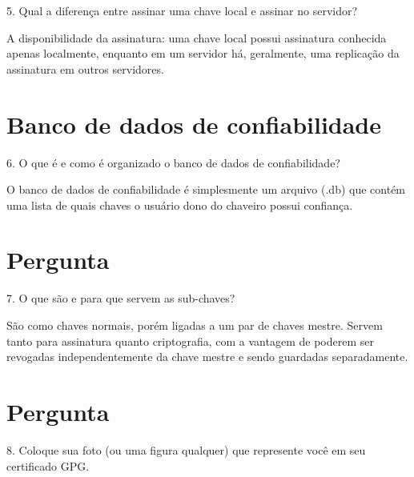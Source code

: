 \documentclass{article}
\begin{document}
    \begin{superframe}
        5. Qual a diferença entre assinar uma chave local e assinar no
        servidor?
    \end{superframe}

     A disponibilidade da assinatura: uma chave local possui assinatura
     conhecida apenas localmente, enquanto em um servidor há, geralmente, uma
     replicação da assinatura em outros servidores.

    \section{Banco de dados de confiabilidade}

    \begin{superframe}
        6. O que é e como é organizado o banco de dados de confiabilidade?
    \end{superframe}
    
    O banco de dados de confiabilidade é simplesmente um arquivo (.db) que
    contém uma lista de quais chaves o usuário dono do chaveiro possui
    confiança.

    \section{Pergunta}

    \begin{superframe}
        7. O que são e para que servem as sub-chaves?
    \end{superframe}

    São como chaves normais, porém ligadas a um par de chaves mestre. Servem
    tanto para assinatura quanto criptografia, com a vantagem de poderem ser
    revogadas independentemente da chave mestre e sendo guardadas
    separadamente.

    \section{Pergunta}

    \begin{superframe}
        8. Coloque sua foto (ou uma figura qualquer) que represente você em seu
        certificado GPG\@.
    \end{superframe}
\end{document}
